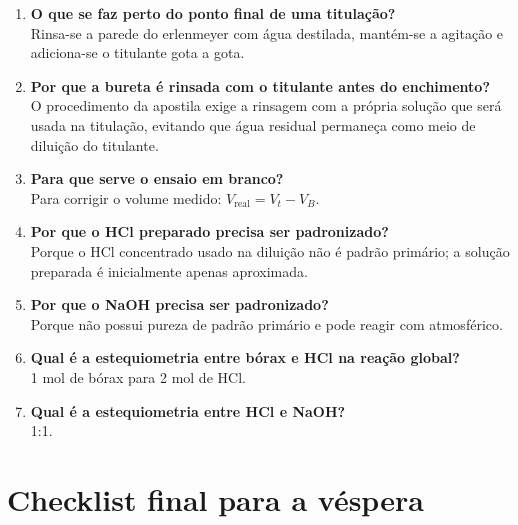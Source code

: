 \documentclass[a4paper,12pt]{article}
\begin{document}
\begin{enumerate}[leftmargin=1.8em]
    \item \textbf{O que se faz perto do ponto final de uma titulação?}\\
    Rinsa-se a parede do erlenmeyer com água destilada, mantém-se a agitação e adiciona-se o titulante gota a gota.

    \item \textbf{Por que a bureta é rinsada com o titulante antes do enchimento?}\\
    O procedimento da apostila exige a rinsagem com a própria solução que será usada na titulação, evitando que água residual permaneça como meio de diluição do titulante.

    \item \textbf{Para que serve o ensaio em branco?}\\
    Para corrigir o volume medido: $V_{\mathrm{real}}=V_t-V_B$.

    \item \textbf{Por que o HCl preparado precisa ser padronizado?}\\
    Porque o HCl concentrado usado na diluição não é padrão primário; a solução preparada é inicialmente apenas aproximada.

    \item \textbf{Por que o NaOH precisa ser padronizado?}\\
    Porque não possui pureza de padrão primário e pode reagir com  atmosférico.

    \item \textbf{Qual é a estequiometria entre bórax e HCl na reação global?}\\
    1 mol de bórax para 2 mol de HCl.

    \item \textbf{Qual é a estequiometria entre HCl e NaOH?}\\
    1:1.
\end{enumerate}

\section{Checklist final para a véspera}
\end{document}
